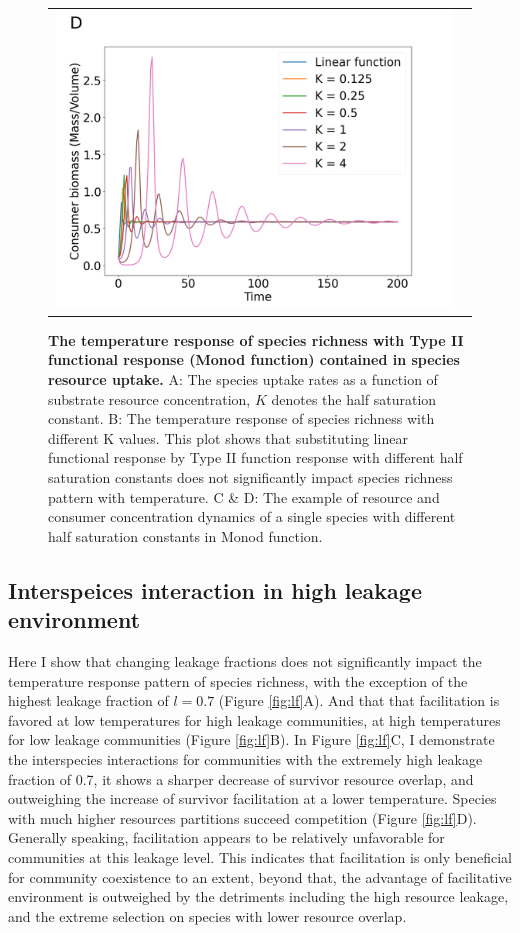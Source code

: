 \begin{figure}[H]
\begin{tabular}{c@{}c@{}}
    \includegraphics[scale=0.27]{./Figures/K_con.png}
    \end{tabular}
    \caption{\textbf{The temperature response of species richness with Type II functional response (Monod function) contained in species resource uptake.} A: The species uptake rates as a function of substrate resource concentration, $K$ denotes the half saturation constant. B: The temperature response of species richness with different K values. This plot shows that substituting linear functional response by Type II function response with different half saturation constants does not significantly impact species richness pattern with temperature. C \& D: The example of resource and consumer concentration dynamics of a single species with different half saturation constants in Monod function. }
    \label{fig:TypeII}
\end{figure}

\subsection{Interspeices interaction in high leakage environment}\label{sec:lf}

Here I show that changing leakage fractions does not significantly impact the temperature response pattern of species richness, with the exception of the highest leakage fraction of $l = 0.7$ (Figure \ref{fig:lf}A). And that that facilitation is favored at low temperatures for high leakage communities, at high temperatures for low leakage communities (Figure \ref{fig:lf}B). In Figure \ref{fig:lf}C, I demonstrate the interspecies interactions for communities with the extremely high leakage fraction of 0.7, it shows a sharper decrease of survivor resource overlap, and outweighing the increase of survivor facilitation at a lower temperature. Species with much higher resources partitions succeed competition (Figure \ref{fig:lf}D). Generally speaking, facilitation appears to be relatively unfavorable for communities at this leakage level. This indicates that facilitation is only beneficial for community coexistence to an extent, beyond that, the advantage of facilitative environment is outweighed by the detriments including the high resource leakage, and the extreme selection on species with lower resource overlap.

